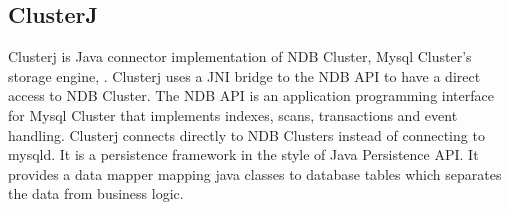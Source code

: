 \subsection{ClusterJ}
Clusterj  is   Java  connector  implementation  of  NDB  Cluster,  Mysql  Cluster’s   storage  engine, \cite{29}.  Clusterj  uses   a  JNI  bridge  to  the  NDB  API  to  have  a  direct  access   to  NDB
Cluster.  The  NDB  API  is   an  application  programming  interface  for  Mysql  Cluster  that
implements   indexes,  scans,  transactions   and  event  handling.  Clusterj  connects   directly   to
NDB  Clusters   instead  of  connecting  to  mysqld.  It  is   a  persistence  framework   in  the  style of
Java  Persistence  API.  It  provides   a  data  mapper  mapping  java  classes   to  database  tables
which separates the data from business logic.


